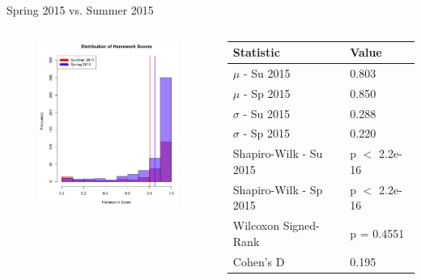 \documentclass{beamer}
\begin{document}
\begin{frame}{Spring 2015 vs. Summer 2015}
\begin{columns}
\begin{column}{2in}
\begin{figure}
	\includegraphics[width=2in]{img/chapter4/hw_su15_vs_sp15}
\end{figure}
\end{column}
\begin{column}{2in}
\begin{scriptsize}
\begin{table}
  \begin{tabular}{|l|l|}
    \hline
    \textbf{Statistic} & \textbf{Value} \\
	\hline
	$\mu$ - Su 2015 & 0.803 \\
	\hline
	$\mu$ - Sp 2015 & 0.850 \\
	\hline
	$\sigma$ - Su 2015 & 0.288 \\
	\hline
	$\sigma$ - Sp 2015 & 0.220 \\
	\hline
	Shapiro-Wilk - Su 2015 & p $<$ 2.2e-16 \\
	\hline
	Shapiro-Wilk - Sp 2015 & p $<$ 2.2e-16 \\
	\hline
	Wilcoxon Signed-Rank & p = 0.4551 \\
	\hline
	Cohen's D & 0.195 \\
	\hline
  \end{tabular}
\end{table}
\end{scriptsize}
\end{column}
\end{columns}
\end{frame}
\end{document}
